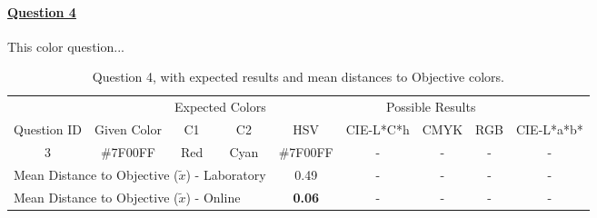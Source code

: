 \paragraph{\ul{Question 4}}
%
This color question...
%
\begin{table}[H]
  \resizebox{\textwidth}{!} {
  \begin{tabular}{@{}ccccccccc@{}}
    \toprule
                                  &                                                       & \multicolumn{2}{c}{Expected Colors}                   & \multicolumn{5}{c}{Possible Results}                                                                                                                                                                                                                                                  \\ \cmidrule(l){3-9}
    \multirow{-2}{*}{Question ID} & \multirow{-2}{*}{Given Color}                         & C1                       & C2                         & HSV                                                   & CIE-L*C*h                                             & CMYK                                                  & RGB                                                   & CIE-L*a*b*                                            \\ \midrule
    \multicolumn{1}{c|}{3}        & \multicolumn{1}{c|}{\cellcolor[HTML]{7F00FF}\#7F00FF} & \multicolumn{1}{c|}{Red} & \multicolumn{1}{c|}{Cyan} & \multicolumn{1}{c||}{\cellcolor[HTML]{7F00FF}\#7F00FF} & \multicolumn{1}{c||}{ - } & \multicolumn{1}{c||}{ - } & \multicolumn{1}{c||}{ - } & \multicolumn{1}{c|}{ - } \\ \midrule
    \multicolumn{4}{l}{Mean Distance to Objective ($\tilde{x}$) - Laboratory}                                                                                   & 0.49                                                  & -                                                  & -                                         & -                                                  & -                                                  \\
    \multicolumn{4}{l}{Mean Distance to Objective ($\tilde{x}$) - Online}                                                                                   & \textbf{0.06}                                                  & -                                                  & -                                         & -                                                  & -                                                  \\ \bottomrule
    \end{tabular}}
  \caption[Question 4, with expected Results.]{Question 4, with expected results and mean distances to Objective colors.}
  \label{table:lab_q4_expected}
\end{table}
%
%
